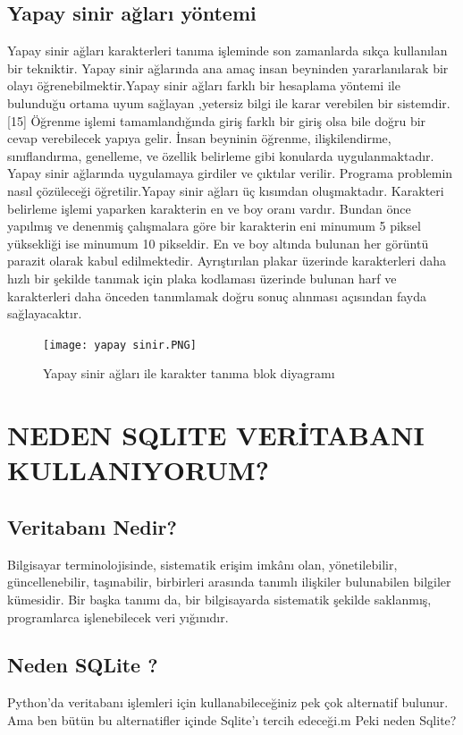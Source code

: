 \subsection{Yapay sinir ağları yöntemi}
\cite{yapaysinir}
Yapay sinir ağları karakterleri tanıma işleminde son zamanlarda sıkça kullanılan bir tekniktir. Yapay sinir ağlarında ana amaç insan beyninden yararlanılarak bir olayı öğrenebilmektir.Yapay sinir ağları farklı bir hesaplama yöntemi ile bulunduğu ortama uyum sağlayan ,yetersiz bilgi ile karar verebilen bir sistemdir.[15] Öğrenme işlemi tamamlandığında giriş farklı bir giriş olsa bile doğru bir cevap verebilecek yapıya gelir. İnsan beyninin öğrenme, ilişkilendirme, sınıflandırma, genelleme, ve özellik belirleme gibi konularda uygulanmaktadır. Yapay sinir ağlarında uygulamaya girdiler ve çıktılar verilir. Programa problemin nasıl çözüleceği öğretilir.Yapay sinir ağları üç kısımdan oluşmaktadır. Karakteri belirleme işlemi yaparken karakterin en ve boy oranı vardır. Bundan önce yapılmış ve denenmiş çalışmalara göre bir karakterin eni minumum 5 piksel yüksekliği ise minumum 10 pikseldir. En ve boy altında bulunan her görüntü parazit olarak kabul edilmektedir.
Ayrıştırılan plakar üzerinde karakterleri daha hızlı bir şekilde tanımak için plaka kodlaması üzerinde bulunan harf ve karakterleri daha önceden tanımlamak doğru sonuç alınması açısından fayda sağlayacaktır.
\begin{figure}
    \centering
    \texttt{[image: yapay sinir.PNG]}
    \caption{Yapay sinir ağları ile karakter tanıma blok diyagramı}
    \label{fig:my_label}
\end{figure}
\section{NEDEN SQLITE VERİTABANI KULLANIYORUM?}
\cite{SQLİTE}
\subsection{Veritabanı Nedir?}
Bilgisayar terminolojisinde, sistematik erişim imkânı olan, yönetilebilir, güncellenebilir, taşınabilir, birbirleri arasında tanımlı ilişkiler bulunabilen bilgiler kümesidir. Bir başka tanımı da, bir bilgisayarda sistematik şekilde saklanmış, programlarca işlenebilecek veri yığınıdır.\\
\subsection{Neden SQLite ?}
Python’da veritabanı işlemleri için kullanabileceğiniz pek çok alternatif bulunur. Ama ben bütün bu alternatifler içinde Sqlite’ı tercih edeceği.m Peki neden Sqlite?

